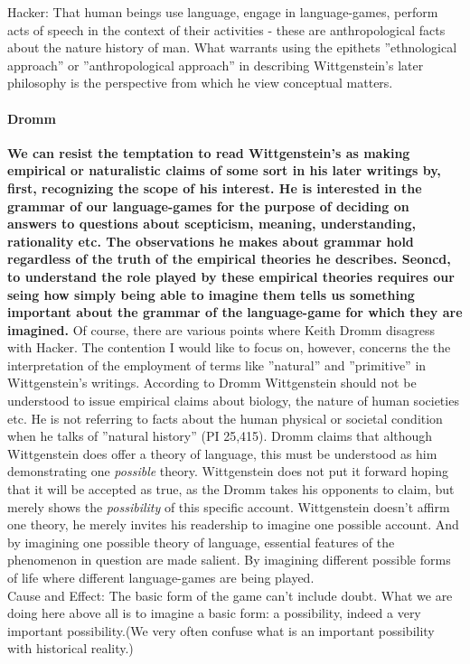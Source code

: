 \documentclass{article}
\begin{document}
Hacker: That human beings use language, engage in language-games, perform acts of speech in the context of their activities - these are anthropological facts about the nature history of man. What warrants using the epithets ''ethnological approach'' or ''anthropological approach'' in describing Wittgenstein's later philosophy is the perspective from which he view conceptual matters. 
\paragraph{Dromm}
\textbf{We can resist the temptation to read Wittgenstein's as making empirical or naturalistic claims of some sort in his later writings by, first, recognizing the scope of his interest. He is interested in the grammar of our language-games for the purpose of deciding on answers to questions about scepticism, meaning, understanding, rationality etc. The observations he makes about grammar hold regardless of the truth of the empirical theories he describes. Seoncd, to understand the role played by these empirical theories requires our seing how simply being able to imagine them tells us something important about the grammar of the language-game for which they are imagined.}
Of course, there are various points where Keith Dromm disagress with Hacker. The contention I would like to focus on, however, concerns the the interpretation of the employment of terms like ''natural'' and ''primitive'' in Wittgenstein's writings. According to Dromm Wittgenstein should not be understood to issue empirical claims about biology, the nature of human societies etc. He is not referring to facts about the human physical or societal condition when he talks of ''natural history'' (PI 25,415). Dromm claims that although Wittgenstein does offer a theory of language, this must be understood as him demonstrating one \textit{possible} theory. Wittgenstein does not put it forward hoping that it will be accepted as true, as the Dromm takes his opponents to claim, but merely shows the \textit{possibility} of this specific account. Wittgenstein doesn't affirm one theory, he merely invites his readership to imagine one possible account. And by imagining one possible theory of language, essential features of the phenomenon in question are made salient. By imagining different possible forms of life where different language-games are being played.\\
Cause and Effect: The basic form of the game can't include doubt. What we are doing here above all is to imagine a basic form: a possibility, indeed a very important possibility.(We very often confuse what is an important possibility with historical reality.)\\
\end{document}
